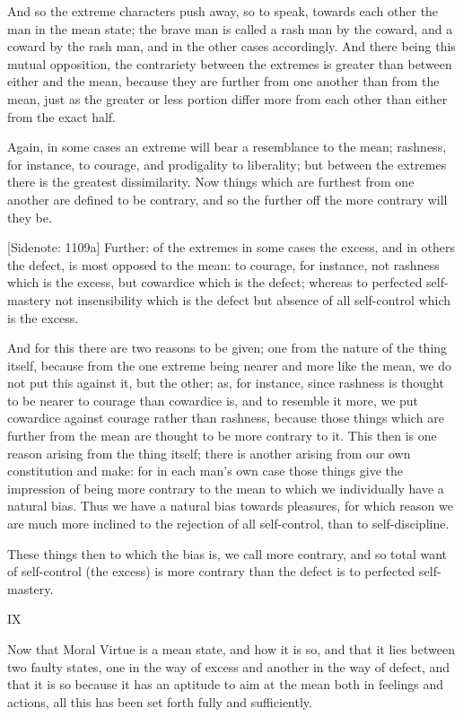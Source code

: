 And so the extreme characters push away, so to speak, towards each other
the man in the mean state; the brave man is called a rash man by
the coward, and a coward by the rash man, and in the other cases
accordingly. And there being this mutual opposition, the contrariety
between the extremes is greater than between either and the mean,
because they are further from one another than from the mean, just as
the greater or less portion differ more from each other than either from
the exact half.

Again, in some cases an extreme will bear a resemblance to the mean;
rashness, for instance, to courage, and prodigality to liberality; but
between the extremes there is the greatest dissimilarity. Now things
which are furthest from one another are defined to be contrary, and so
the further off the more contrary will they be.

[Sidenote: 1109a] Further: of the extremes in some cases the excess,
and in others the defect, is most opposed to the mean: to courage, for
instance, not rashness which is the excess, but cowardice which is the
defect; whereas to perfected self-mastery not insensibility which is the
defect but absence of all self-control which is the excess.

And for this there are two reasons to be given; one from the nature of
the thing itself, because from the one extreme being nearer and more
like the mean, we do not put this against it, but the other; as, for
instance, since rashness is thought to be nearer to courage than
cowardice is, and to resemble it more, we put cowardice against courage
rather than rashness, because those things which are further from the
mean are thought to be more contrary to it. This then is one reason
arising from the thing itself; there is another arising from our own
constitution and make: for in each man's own case those things give the
impression of being more contrary to the mean to which we individually
have a natural bias. Thus we have a natural bias towards pleasures,
for which reason we are much more inclined to the rejection of all
self-control, than to self-discipline.

These things then to which the bias is, we call more contrary, and so
total want of self-control (the excess) is more contrary than the defect
is to perfected self-mastery.


IX

Now that Moral Virtue is a mean state, and how it is so, and that it
lies between two faulty states, one in the way of excess and another in
the way of defect, and that it is so because it has an aptitude to aim
at the mean both in feelings and actions, all this has been set forth
fully and sufficiently.

